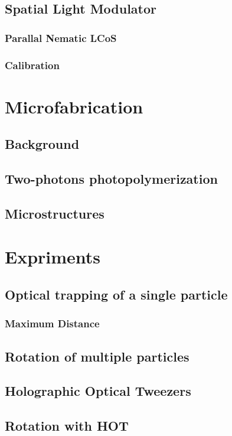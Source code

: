 \documentclass{kepfl}
\begin{document}
\section{Spatial Light Modulator}
\subsection{Parallal Nematic LCoS}
\subsection{Calibration}

\chapter{Microfabrication}
\section{Background}
\section{Two-photons photopolymerization}
\section{Microstructures}

\chapter{Expriments}
\section{Optical trapping of a single particle}
\subsection{Maximum Distance}

\section{Rotation of multiple particles}
\section{Holographic Optical Tweezers}
\section{Rotation with HOT}
\end{document}
